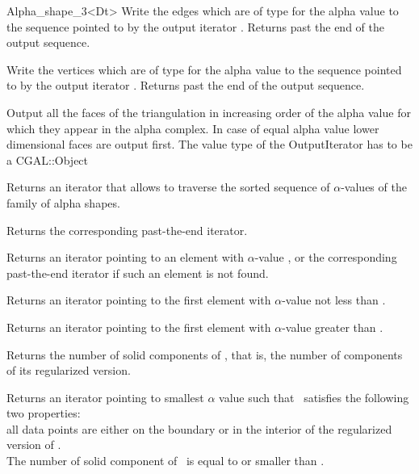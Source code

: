 \begin{ccRefClass} {Alpha_shape_3<Dt>}
{Write the edges which are of type  for 
the alpha value  to the sequence
pointed to by the output iterator . Returns past the end
of the output sequence.}

{Write the vertices which are of type  for 
the alpha value  to the sequence
pointed to by the output iterator . Returns past the end
of the output sequence.}

{Output all the faces  of the triangulation
in increasing order of  the alpha value for which they appear
in the alpha complex. In case of equal alpha value
lower dimensional faces are output first.
The value type of the OutputIterator has to be a  CGAL::Object}



{Returns an iterator that allows to traverse the
sorted sequence of $\alpha$-values of the family of alpha shapes.}

{Returns the corresponding past-the-end iterator.}

{Returns an iterator pointing to an element with $\alpha$-value
, or the corresponding past-the-end iterator if such 
an element is not found.}

{Returns an iterator pointing to the first element with
$\alpha$-value not less than .}

{Returns an iterator pointing to the first element with $\alpha$-value
greater than .}


{Returns the number of solid components of \ccVar, that is, the number of
components of its 
regularized version.}

{Returns an iterator pointing to smallest $\alpha$ value
such that \ccVar\ satisfies the following two properties:\\
all data points are either on the boundary or in the interior 
of the regularized version of \ccVar. \\
The number of solid component of \ccVar\  is  equal to or
smaller than .}


\end{ccRefClass}
